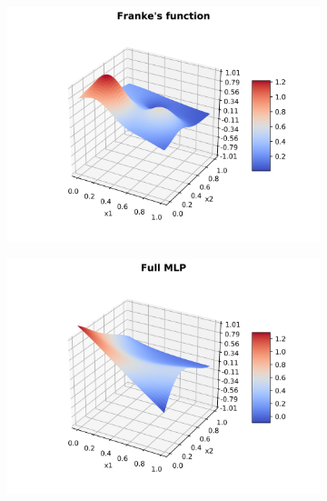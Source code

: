 \documentclass[a4paper]{article}
\numberwithin{equation}{section} %
\numberwithin{figure}{section} %
\numberwithin{table}{section} %
\theoremstyle{definition}
\begin{document}
\begin{figure}[H]
	\centering
	\begin{subfigure}{.32\textwidth}
		\centering
		\includegraphics[width=1.0\linewidth]{images/franke.png}
	\end{subfigure}
	\begin{subfigure}{.32\textwidth}
		\centering
		\includegraphics[width=1.0\linewidth]{images/MLP_N_25_sigma_3_rho_1e-05.png}
	\end{subfigure}
	\begin{subfigure}{.32\textwidth}
		\centering

\end{subfigure}
\end{figure}
\end{document}
